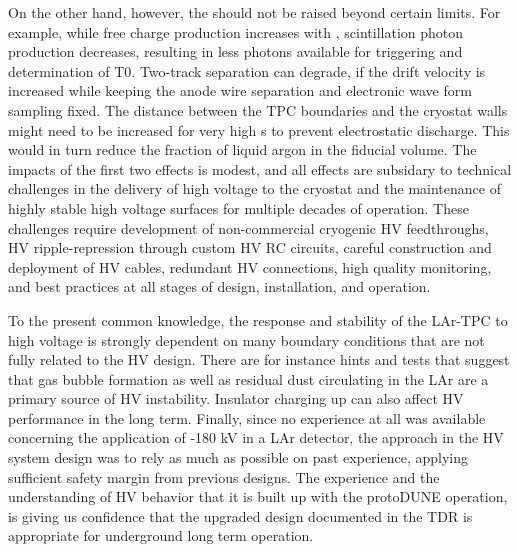 On the other hand, however, the \efield should not be raised beyond certain limits. For example, while free charge production increases with \efield, scintillation photon production decreases, resulting in less photons available for triggering and determination of T0. Two-track separation can degrade, if the drift velocity is increased while keeping the anode wire separation and electronic wave form sampling fixed. The distance between the TPC boundaries and the cryostat walls might  need to be increased for very high \efield{}s to prevent electrostatic discharge. This would in turn reduce the fraction of liquid argon in the fiducial volume. The impacts of the first two effects is modest, and all effects are subsidary to technical challenges in the delivery of high voltage to the cryostat and the maintenance of highly stable high voltage surfaces for multiple decades of operation. These challenges require development of non-commercial cryogenic HV feedthroughs, HV ripple-repression through custom HV RC circuits, careful construction and deployment of HV cables, redundant HV connections, high quality monitoring, and best practices at all stages of design, installation, and operation.


To the present common knowledge, the response and stability of the LAr-TPC to high voltage is strongly dependent on many boundary conditions that are not fully related to the  HV design. There are for instance hints and tests that suggest that gas bubble formation as well as residual dust circulating in the LAr are a primary source of HV instability.  Insulator charging up can also affect HV performance in the long term. Finally, since no experience at all was available concerning the application of -180 kV in a LAr detector, the approach in the HV system design was to rely as much as possible on past experience, applying sufficient safety margin from previous designs.  The experience and the understanding of HV behavior that it is built up  with the protoDUNE operation, is giving us confidence that the upgraded design documented in the TDR is appropriate for underground long term operation.  

